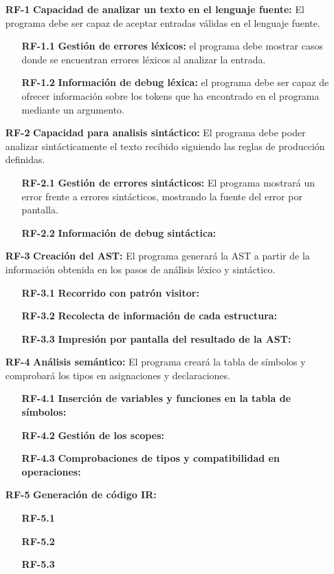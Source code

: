\begin{enumerate}
\item[\textbf{RF-1}] \textbf{Capacidad de analizar un texto en el lenguaje fuente:} El programa debe ser capaz de aceptar entradas válidas en el lenguaje fuente.
	\begin{enumerate}
		\item[\textbf{RF-1.1}] \textbf{Gestión de errores léxicos:} el programa debe mostrar casos donde se encuentran errores léxicos al analizar la entrada.
		\item[\textbf{RF-1.2}] \textbf{Información de debug léxica:} el programa debe ser capaz de ofrecer información sobre los tokens que ha encontrado en el programa mediante un argumento.
	\end{enumerate}
\item[\textbf{RF-2}] \textbf{Capacidad para analisis sintáctico:} El programa debe poder analizar sintácticamente el texto recibido siguiendo las reglas de producción definidas.
	\begin{enumerate}
		\item[\textbf{RF-2.1}] \textbf{Gestión de errores sintácticos:} El programa mostrará un error frente a errores sintácticos, mostrando la fuente del error por pantalla.
		\item[\textbf{RF-2.2}] \textbf{Información de debug sintáctica:}  
	\end{enumerate}
\item[\textbf{RF-3}] \textbf{Creación del AST:} El programa generará la AST a partir de la información obtenida en los pasos de análisis léxico y sintáctico.
	\begin{enumerate}	
		\item[\textbf{RF-3.1}] \textbf{Recorrido con patrón visitor:}
		\item[\textbf{RF-3.2}] \textbf{Recolecta de información de cada estructura:}
		\item[\textbf{RF-3.3}] \textbf{Impresión por pantalla del resultado de la AST:}
	\end{enumerate}	
\item[\textbf{RF-4}] \textbf{Análisis semántico:} El programa creará la tabla de símbolos y comprobará los tipos en asignaciones y declaraciones.
	\begin{enumerate}	
		\item[\textbf{RF-4.1}] \textbf{Inserción de variables y funciones en la tabla de símbolos:}
		\item[\textbf{RF-4.2}] \textbf{Gestión de los scopes:}
		\item[\textbf{RF-4.3}] \textbf{Comprobaciones de tipos y compatibilidad en operaciones:}
	\end{enumerate}	
\item[\textbf{RF-5}] \textbf{Generación de código IR:} 
	\begin{enumerate}	
		\item[\textbf{RF-5.1}] \textbf{}
		\item[\textbf{RF-5.2}] \textbf{}
		\item[\textbf{RF-5.3}] \textbf{}
	\end{enumerate}	
\end{enumerate}


